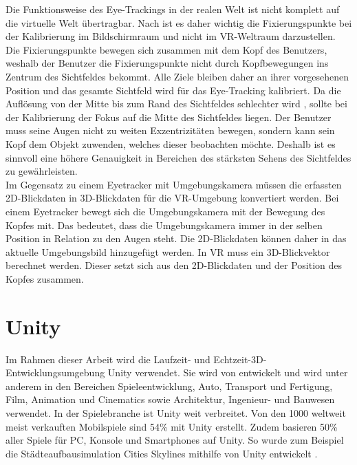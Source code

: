 Die Funktionsweise des Eye-Trackings in der realen Welt ist nicht komplett auf die virtuelle Welt übertragbar. Nach \citeauthor{Clay_Koenig_Koenig_2019} ist es daher wichtig die Fixierungspunkte bei der Kalibrierung im Bildschirmraum und nicht im \ac{VR}-Weltraum darzustellen. Die Fixierungspunkte bewegen sich zusammen mit dem Kopf des Benutzers, weshalb der Benutzer die Fixierungspunkte nicht durch Kopfbewegungen ins Zentrum des Sichtfeldes bekommt. Alle Ziele bleiben daher an ihrer vorgesehenen Position und das gesamte Sichtfeld wird für das Eye-Tracking kalibriert. \cite{Clay_Koenig_Koenig_2019} Da die Auflösung von der Mitte bis zum Rand des Sichtfeldes schlechter wird \cite{Kreylos.2017}, sollte bei der Kalibrierung der Fokus auf die Mitte des Sichtfeldes liegen. Der Benutzer muss seine Augen nicht zu weiten Exzentrizitäten bewegen, sondern kann sein Kopf dem Objekt zuwenden, welches dieser beobachten möchte. Deshalb ist es sinnvoll eine höhere Genauigkeit in Bereichen des stärksten Sehens des Sichtfeldes zu gewährleisten. \cite{Clay_Koenig_Koenig_2019} \\ 
Im Gegensatz zu einem Eyetracker mit Umgebungskamera müssen die erfassten 2D-Blickdaten in 3D-Blickdaten für die \ac{VR}-Umgebung konvertiert werden. Bei einem Eyetracker bewegt sich die Umgebungskamera mit der Bewegung des Kopfes mit. Das bedeutet, dass die Umgebungskamera immer in der selben Position in Relation zu den Augen steht. Die 2D-Blickdaten können daher in das aktuelle Umgebungsbild hinzugefügt werden. In \ac{VR} muss ein 3D-Blickvektor berechnet werden. Dieser setzt sich aus den 2D-Blickdaten und der Position des Kopfes zusammen. \cite{Clay_Koenig_Koenig_2019}

\section{Unity}
Im Rahmen dieser Arbeit wird die Laufzeit- \cite{Schwichtenberg.2020} und Echtzeit-3D-Entwicklungsumgebung \cite{Unity.2020} Unity verwendet. Sie wird von \citeauthor{Unity-Facts.2020} entwickelt und wird unter anderem in den Bereichen Spieleentwicklung, Auto, Transport und Fertigung, Film, Animation und Cinematics sowie Architektur, Ingenieur- und Bauwesen verwendet. \cite{Unity.2020} In der Spielebranche ist Unity weit verbreitet. Von den 1000 weltweit meist verkauften Mobilspiele sind 54\% mit Unity erstellt. Zudem basieren 50\% aller Spiele für PC, Konsole und Smartphones auf Unity. \cite{Unity-Facts.2020} So wurde zum Beispiel die Städteaufbausimulation Cities Skylines mithilfe von Unity entwickelt \cite{Cities.2020}.

